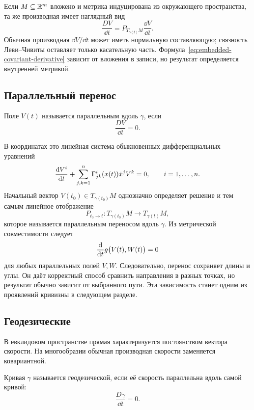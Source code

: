 Если $M\subseteq\mathbb{R}^m$ вложено и метрика индуцирована из окружающего пространства, та же производная имеет наглядный вид
\begin{equation}
\label{eq:embedded-covariant-derivative}
\frac{DV}{\dd t}
=
P_{T_{\gamma(t)}M}\frac{\dd V}{\dd t}.
\end{equation}
Обычная производная $\dd V/\dd t$ может иметь нормальную составляющую; связность Леви--Чивиты оставляет только касательную часть. Формула~\eqref{eq:embedded-covariant-derivative} зависит от вложения в записи, но результат определяется внутренней метрикой.

\subsection{Параллельный перенос}

\begin{definition}
Поле $V(t)$ называется параллельным вдоль $\gamma$, если
\begin{equation}
\label{eq:parallel-field-equation}
\frac{DV}{\dd t}=0.
\end{equation}
\end{definition}

В координатах это линейная система обыкновенных дифференциальных уравнений
\begin{equation}
\label{eq:parallel-transport-ode}
\frac{\mathop{}\!\mathrm{d} V^i}{\mathop{}\!\mathrm{d} t}
+
\sum_{j,k=1}^n
\Gamma^i_{jk}(x(t))\dot x^jV^k
=0,
\qquad i=1,\ldots,n.
\end{equation}
Начальный вектор $V(t_0)\in T_{\gamma(t_0)}M$ однозначно определяет решение и тем самым линейное отображение
\[
P_{t_0\to t}:T_{\gamma(t_0)}M\to T_{\gamma(t)}M,
\]
которое называется параллельным переносом вдоль $\gamma$. Из метрической совместимости следует
\[
\frac{\mathop{}\!\mathrm{d} }{\mathop{}\!\mathrm{d} t}g\bigl(V(t),W(t)\bigr)=0
\]
для любых параллельных полей $V,W$. Следовательно, перенос сохраняет длины и углы. Он даёт корректный способ сравнить направления в разных точках, но результат обычно зависит от выбранного пути. Эта зависимость станет одним из проявлений кривизны в следующем разделе.

\subsection{Геодезические}

В евклидовом пространстве прямая характеризуется постоянством вектора скорости. На многообразии обычная производная скорости заменяется ковариантной.

\begin{definition}
Кривая $\gamma$ называется геодезической, если её скорость параллельна вдоль самой кривой:
\begin{equation}
\label{eq:geodesic-invariant-equation}
\frac{D\dot\gamma}{\dd t}=0.
\end{equation}
\end{definition}

